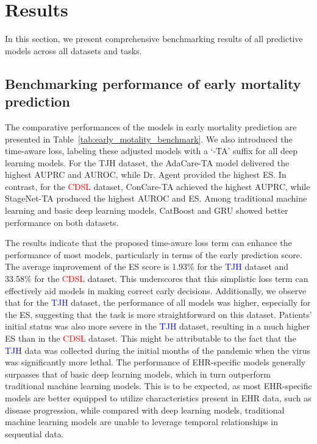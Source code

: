 \section{Results}

In this section, we present comprehensive benchmarking results of all predictive models across all datasets and tasks.

\subsection{Benchmarking performance of early mortality prediction}

The comparative performances of the models in early mortality prediction are presented in Table~\ref{tab:early_motality_benchmark}. We also introduced the time-aware loss, labeling these adjusted models with a `-TA' suffix for all deep learning models. For the TJH dataset, the AdaCare-TA model delivered the highest AUPRC and AUROC, while Dr. Agent provided the highest ES. In contrast, for the \textcolor{red}{CDSL} dataset, ConCare-TA achieved the highest AUPRC, while StageNet-TA produced the highest AUROC and ES. Among traditional machine learning and basic deep learning models, CatBoost and GRU showed better performance on both datasets.

The results indicate that the proposed time-aware loss term can enhance the performance of most models, particularly in terms of the early prediction score. The average improvement of the ES score is 1.93\% for the \textcolor{blue}{TJH} dataset and 33.58\% for the \textcolor{red}{CDSL} dataset. This underscores that this simplistic loss term can effectively aid models in making correct early decisions. Additionally, we observe that for the \textcolor{blue}{TJH} dataset, the performance of all models was higher, especially for the ES, suggesting that the task is more straightforward on this dataset. Patients' initial status was also more severe in the \textcolor{blue}{TJH} dataset, resulting in a much higher ES than in the \textcolor{red}{CDSL} dataset. This might be attributable to the fact that the \textcolor{blue}{TJH} data was collected during the initial months of the pandemic when the virus was significantly more lethal. The performance of EHR-specific models generally surpasses that of basic deep learning models, which in turn outperform traditional machine learning models. This is to be expected, as most EHR-specific models are better equipped to utilize characteristics present in EHR data, such as disease progression, while compared with deep learning models, traditional machine learning models are unable to leverage temporal relationships in sequential data.


